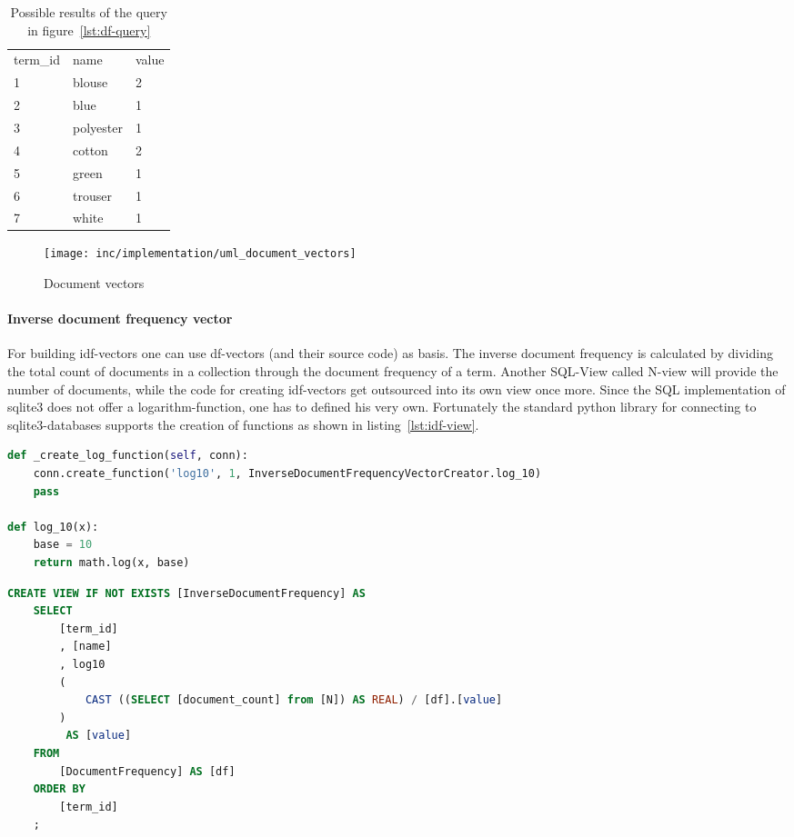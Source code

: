 \begin{table}
    \center
    \begin{tabular}{ l | l | l }
        \rowcolor{\dustRowHead}
        \multicolumn{3}{ c }{\textbf{df}}\\\hline
        term\_id    & name      & value\\\hline
        1           & blouse    & 2\\
        2           & blue      & 1\\
        3           & polyester & 1\\
        4           & cotton    & 2\\
        5           & green     & 1\\
        6           & trouser   & 1\\
        7           & white     & 1\\
    \end{tabular}
    \caption{Possible results of the query in figure~\ref{lst:df-query}}
    \label{tab:df-query-result}
\end{table}

\begin{figure}[h]
    \center
    \texttt{[image: inc/implementation/uml\_document\_vectors]}
    \caption{Document vectors}
    \label{fig:uml-document-vectors}
\end{figure}

\paragraph{Inverse document frequency vector}
For building idf-vectors one can use df-vectors (and their source code) as basis.
The inverse document frequency is calculated by dividing the total count of documents in a collection through the document frequency of a term.
Another SQL-View called N-view will provide the number of documents, while the code for creating idf-vectors get outsourced into its own view once more.
Since the SQL implementation of \gls{sqlite3} does not offer a logarithm-function, one has to defined his very own.
Fortunately the standard python library for connecting to sqlite3-databases supports the creation of functions as shown in listing~\ref{lst:idf-view}.


\begin{lstlisting}[language=Python,caption={SQL-statement to create the InverseDocumentFrequency-view},label={lst:idf-view}]
def _create_log_function(self, conn):
    conn.create_function('log10', 1, InverseDocumentFrequencyVectorCreator.log_10)
    pass

def log_10(x):
    base = 10
    return math.log(x, base)
\end{lstlisting}
\begin{lstlisting}[language=SQL]
CREATE VIEW IF NOT EXISTS [InverseDocumentFrequency] AS
    SELECT
        [term_id]
        , [name]
        , log10
        (
            CAST ((SELECT [document_count] from [N]) AS REAL) / [df].[value]
        )
         AS [value]
    FROM
        [DocumentFrequency] AS [df]
    ORDER BY
        [term_id]
    ;
\end{lstlisting}


